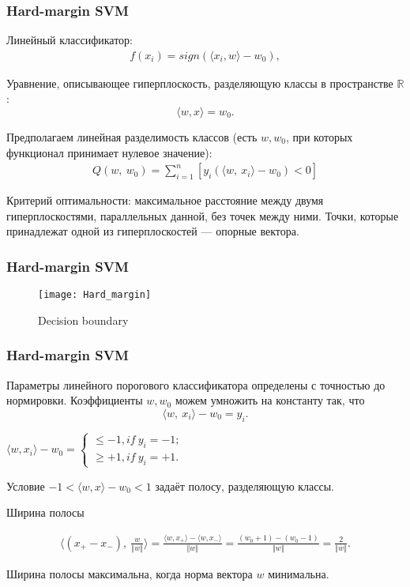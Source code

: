 \documentclass[11pt]{beamer}
\begin{document}
\begin{frame}
	\frametitle{Hard-margin SVM}
	
	Линейный классификатор:
	\begin{eqnarray}
		f\left({x}_i\right)=sign\left(\langle{x}_i,{w}\rangle -w_0\right),
	\end{eqnarray}
	
	Уравнение, описывающее гиперплоскость, разделяющую классы в пространстве $\mathbb{R}$:
	$$
	\langle w, x \rangle = w_0. 
	$$
	
	Предполагаем линейная разделимость классов (есть $w, w_0$, при которых функционал принимает нулевое значение):
	\begin{eqnarray}
		Q(w,\ w_{0})=\sum_{i=1}^{n}[y_{i}(\langle w,\ x_{i}\rangle-w_{0})<0]
	\end{eqnarray}
	
	Критерий оптимальности: максимальное расстояние между
	двумя гиперплоскостями, параллельных данной, без точек между ними. Точки, которые	принадлежат одной из гиперплоскостей — опорные вектора.
		
		
\end{frame}

\begin{frame}
	\frametitle{Hard-margin SVM}
	
	
	\begin{figure}
		\texttt{[image: Hard\_margin]}
		\caption{Decision boundary}
		\label{3}
	\end{figure}
	
\end{frame}

\begin{frame}
	\frametitle{Hard-margin SVM}
	
	Параметры линейного порогового классификатора определены с точностью до нормировки. Коэффициенты $w, w_0$ можем умножить на константу так, что
	$$
	\langle w,\ x_{i}\rangle-w_{0}=y_{i}.
	$$
	
	\begin{center}
		$\langle w, x_{i}\rangle-w_{0} = \left\{\begin{array}{ll}
			\leq-1, if \ y_{i}=-1;\\
			\geq+1, if \ y_{i}=+1.
		\end{array}\right.$
	\end{center}
	
	Условие $-1<\langle w, x\rangle-w_{0}<1$ задаёт полосу, разделяющую классы.
	
	Ширина полосы
			
	\begin{align*}
		\langle(x_{+}-x_{-}),\ \frac{w}{\Vert w\Vert}\rangle=\frac{\langle w,x_{+}\rangle-\langle w,x_{-}\rangle}{\Vert w\Vert}=\frac{(w_{0}+1)-(w_{0}-1)}{\Vert w\Vert}=\frac{2}{\Vert w\Vert}.
	\end{align*}
	
	Ширина полосы максимальна, когда норма вектора $w$ минимальна.
	
\end{frame}
\end{document}
